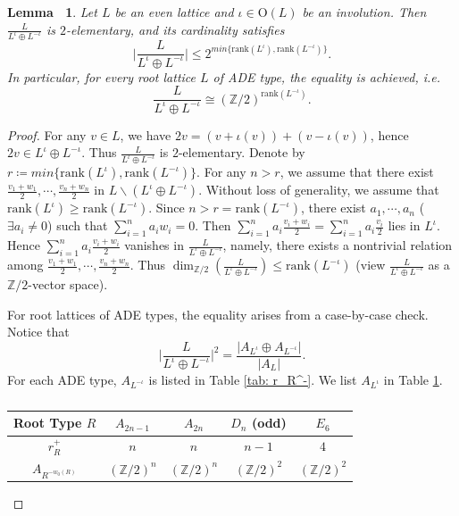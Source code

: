 \documentclass[12pt,reqno,a4paper]{amsart}
\newtheorem{lem}[thm]{Lemma~}
\theoremstyle{remark}
\theoremstyle{definition}
\begin{document}
\begin{lem}
\label{lem: saturation induced by involution, inequality and ADE case}
    Let $L$ be an even lattice and $\iota\in \mathrm{O}(L)$ be an involution.
    Then $\frac{L}{L^\iota \oplus L^{-\iota}}$ is $2$-elementary, and its cardinality satisfies
    \begin{equation*}
        \bigg|\frac{L}{L^\iota \oplus L^{-\iota}}\bigg| \le 2^{min\{\mathrm{rank} (L^\iota), \mathrm{rank} (L^{-\iota})\}}.
    \end{equation*}
    In particular, for every root lattice $L$ of ADE type, the equality is achieved, i.e. 
    \begin{equation*}
        \frac{L}{L^{\iota} \oplus L^{-\iota}} \cong (\mathbb{Z}/2)^{\mathrm{rank} (L^{-\iota})}.
    \end{equation*}
\end{lem}
\begin{proof}
    For any $v\in L$, we have $2v = (v+\iota(v))+(v-\iota(v))$, hence $2v\in L^{\iota} \oplus L^{-\iota}$.
    Thus $\frac{L}{L^\iota \oplus L^{-\iota}}$ is $2$-elementary.
    Denote by $r\coloneqq min\{\mathrm{rank} (L^\iota), \mathrm{rank} (L^{-\iota})\}$.
    For any $n>r$, we assume that there exist $\frac{v_1+w_1}{2},\cdots,\frac{v_n+w_n}{2}$ in $L\backslash(L^{\iota} \oplus L^{-\iota})$.
    Without loss of generality, we assume that $\mathrm{rank} (L^\iota) \ge \mathrm{rank} (L^{-\iota})$.
    Since $n > r=\mathrm{rank} (L^{-\iota})$, there exist $a_1,\cdots,a_n$ ($\exists a_i\neq 0$) such that $\sum\limits_{i=1}^n a_i w_i = 0$.
    Then $\sum\limits_{i=1}^n a_i \frac{v_i+w_i}{2} = \sum\limits_{i=1}^n a_i \frac{v_i}{2}$ lies in $L^\iota$.
    Hence $\sum\limits_{i=1}^n a_i \frac{v_i+w_i}{2}$ vanishes in $\frac{L}{L^{\iota} \oplus L^{-\iota}}$, namely, there exists a nontrivial relation among $\frac{v_1+w_1}{2},\cdots,\frac{v_n+w_n}{2}$.
    Thus $\dim_{\mathbb{Z}/2}(\frac{L}{L^\iota \oplus L^{-\iota}}) \le \mathrm{rank} (L^{-\iota})$ (view $\frac{L}{L^\iota \oplus L^{-\iota}}$ as a $\mathbb{Z}/2$-vector space).

    For root lattices of ADE types, the equality arises from a case-by-case check.
    Notice that 
    \begin{equation*}
        \bigg|\frac{L}{L^\iota \oplus L^{-\iota}}\bigg|^2 = \frac{|A_{L^\iota} \oplus A_{L^{-\iota}}|}{|A_L|}.
    \end{equation*}
    For each ADE type, $A_{L^{-\iota}}$ is listed in Table \ref{tab: r_R^-}.
    We list $A_{L^\iota}$ in Table \ref{tab: r_R^+}.
    \begin{table}[htbp]      \centering      \caption{}      \begin{tabular}{ccccc}
    \toprule
    Root Type $R$ & $A_{2n-1}$ & $A_{2n}$ & $D_{n}$ (odd) & $E_6$  \\      \midrule
    $r_R^+$ & $n$ & $n$ & $n-1$ & $4$ \\     $A_{R^{-w_0(R)}}$ & $(\mathbb{Z}/2)^{n}$ & $(\mathbb{Z}/2)^n$ & $(\mathbb{Z}/2)^2$ & $(\mathbb{Z}/2)^2$ \\      \bottomrule
    \end{tabular}
    \label{tab: r_R^+}      \end{table}
\end{proof}
\end{document}
